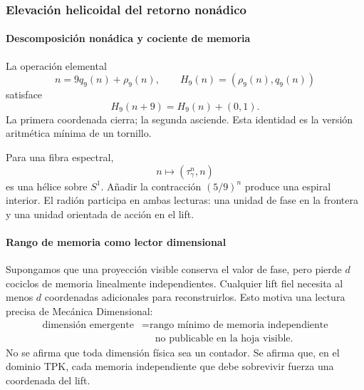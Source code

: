\subsubsection{Elevación helicoidal del retorno nonádico}

\paragraph{Descomposición nonádica y cociente de memoria}

La operación elemental
\begin{equation}
n=9q_9(n)+\rho_9(n),
\qquad
H_9(n)=(\rho_9(n),q_9(n))
\label{eq:H9}
\end{equation}
satisface
\begin{equation}
H_9(n+9)=H_9(n)+(0,1).
\label{eq:H9-helix}
\end{equation}
La primera coordenada cierra; la segunda asciende. Esta identidad es la
versión aritmética mínima de un tornillo.

Para una fibra espectral,
\[
n\longmapsto(\tau_\gamma^n,n)
\]
es una hélice sobre \(S^1\). Añadir la contracción \((5/9)^n\) produce una
espiral interior. El radión participa en ambas lecturas: una unidad de fase
en la frontera y una unidad orientada de acción en el lift.

\paragraph{Rango de memoria como lector dimensional}

Supongamos que una proyección visible conserva el valor de fase, pero pierde
\(d\) cociclos de memoria linealmente independientes. Cualquier lift fiel
necesita al menos \(d\) coordenadas adicionales para reconstruirlos. Esto
motiva una lectura precisa de Mecánica Dimensional:
\begin{equation}
\begin{aligned}
\text{dimensión emergente}
&=\text{rango mínimo de memoria independiente}\\
&\phantom{=}\text{no publicable en la hoja visible}.
\end{aligned}
\label{eq:dimension-memory}
\end{equation}
No se afirma que toda dimensión física sea un contador. Se afirma que, en el
dominio TPK, cada memoria independiente que debe sobrevivir fuerza una
coordenada del lift.

